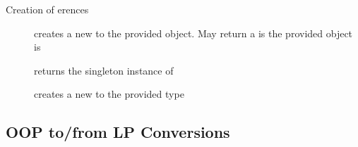 \documentclass[handout]{beamer}
\begin{document}
\begin{frame}{Creation of erences}
    \begin{description}
        \item[] creates a new  to the provided object. May return a  is the provided object is 
        
        \bigskip

        \item[] returns the singleton instance of 
        
        \bigskip
        
        \item[] creates a new  to the provided type 
    \end{description}
\end{frame}

\subsection{OOP to/from LP Conversions}
\end{document}
